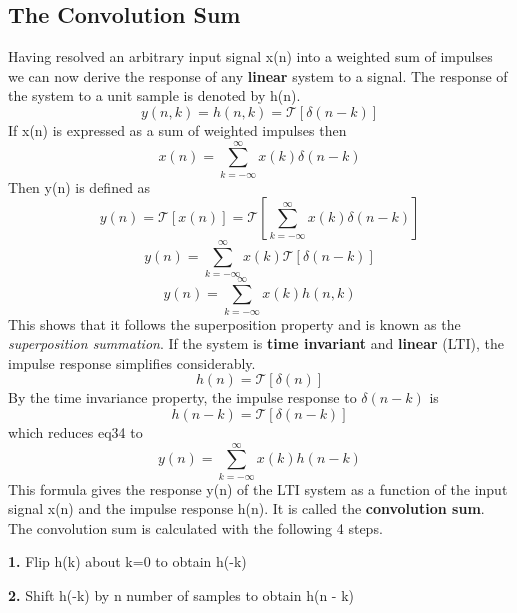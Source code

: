 \documentclass{article} %
\begin{document}
	\subsection{The Convolution Sum}
	Having resolved an arbitrary input signal x(n) into a weighted sum of impulses we can now derive the response of any \textbf{linear} system to a signal. The response of the system to a unit sample is denoted by h(n). 
	\begin{equation}
 	y(n, k) = h(n, k) = \mathcal{T}[\delta (n-k)]
	\end{equation}
	If x(n) is expressed as a sum of weighted impulses then 
	\begin{equation}
 	x(n) = \sum_{k = -\infty}^{\infty} x(k) \delta(n-k)
	\end{equation}
	Then y(n) is defined as 
	\begin{equation}
 	y(n) = \mathcal{T}[x(n)] = \mathcal{T}[\sum_{k=-\infty}^{\infty} x(k)\delta(n - k)]
	\end{equation}
	\begin{equation}
 	y(n) = \sum_{k=-\infty}^{\infty}x(k) \mathcal{T}[\delta(n - k)]
	\end{equation}
	\begin{equation}
 	y(n) = \sum_{k=-\infty}^{\infty} x(k)h(n, k)
	\end{equation}
	This shows that it follows the superposition property and is known as the \textit{superposition summation}. If the system is \textbf{time invariant} and \textbf{linear} (LTI), the impulse response simplifies considerably.
	\begin{equation}
 	h(n) = \mathcal{T}[ \delta(n)]
	\end{equation}
	By the time invariance property, the impulse response to $\delta(n-k)$ is
	\begin{equation}
 	h(n-k) = \mathcal{T}[\delta(n-k)]
	\end{equation}
	which reduces eq34 to 
	\begin{equation}
 	y(n) = \sum_{k=-\infty}^{\infty}x(k)h(n-k)
	\end{equation}
	This formula gives the response y(n) of the LTI system as a function of the input signal x(n) and the impulse response h(n). It is called the \textbf{convolution sum}. The convolution sum is calculated with the following 4 steps.
	
	\textbf{1.} Flip h(k) about k=0 to obtain h(-k)
	
	\textbf{2.} Shift h(-k) by n number of samples to obtain h(n - k)
	
\end{document}
